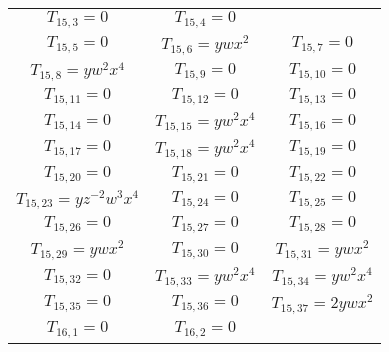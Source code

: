 \begin{longtable}{|c|c|c|}
$T_{15,3}= 0$&

$T_{15,4}= 0$\\

$T_{15,5}= 0$&

$T_{15,6}= ywx^2$&

$T_{15,7}= 0$\\

$T_{15,8}= yw^2x^4$&

$T_{15,9}= 0$&

$T_{15,10}= 0$\\

$T_{15,11}= 0$&

$T_{15,12}= 0$&

$T_{15,13}= 0$\\

$T_{15,14}= 0$&

$T_{15,15}= yw^2x^4$&

$T_{15,16}= 0$\\

$T_{15,17}= 0$&

$T_{15,18}= yw^2x^4$&

$T_{15,19}= 0$\\

$T_{15,20}= 0$&

$T_{15,21}= 0$&

$T_{15,22}= 0$\\

$T_{15,23}= yz^{-2}w^3x^4$&

$T_{15,24}= 0$&

$T_{15,25}= 0$\\

$T_{15,26}= 0$&

$T_{15,27}= 0$&

$T_{15,28}= 0$\\

$T_{15,29}= ywx^2$&

$T_{15,30}= 0$&

$T_{15,31}= ywx^2$\\

$T_{15,32}= 0$&

$T_{15,33}= yw^2x^4$&

$T_{15,34}= yw^2x^4$\\

$T_{15,35}= 0$&

$T_{15,36}= 0$&

$T_{15,37}= 2ywx^2$\\

$T_{16,1}= 0$&

$T_{16,2}= 0$&


\end{longtable}
